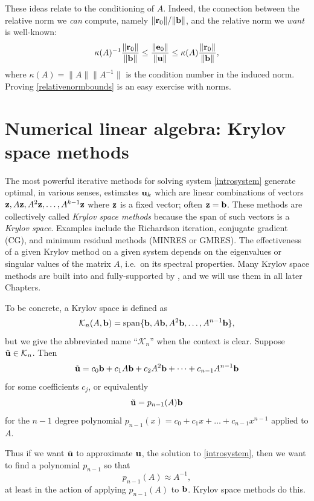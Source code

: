 These ideas relate to the conditioning of $A$.  Indeed, the connection between the relative norm we \emph{can} compute, namely $\|\mathbf{r}_0\|/\|\mathbf{b}\|$, and the relative norm we \emph{want} is well-known:
\begin{equation}
\kappa(A)^{-1} \frac{\|\mathbf{r}_0\|}{\|\mathbf{b}\|} \le \frac{\|\mathbf{e}_0\|}{\|\mathbf{u}\|} \le \kappa(A) \frac{\|\mathbf{r}_0\|}{\|\mathbf{b}\|}, \label{relativenormbounds}
\end{equation}
where $\kappa(A) = \|A\| \|A^{-1}\|$ is the condition number in the induced norm.  Proving \eqref{relativenormbounds} is an easy exercise with norms.



\section{Numerical linear algebra: Krylov space methods}

The most powerful iterative methods for solving system \eqref{introsystem} generate optimal, in various senses, estimates $\mathbf{u}_k$ which are linear combinations of vectors $\mathbf{z},A\mathbf{z},A^2\mathbf{z},\dots,A^{k-1}\mathbf{z}$ where $\mathbf{z}$ is a fixed vector; often $\mathbf{z}=\mathbf{b}$.  These methods are collectively called \emph{Krylov space methods} because the span of such vectors is a \emph{Krylov space}.  Examples include the Richardson iteration, conjugate gradient (CG), and minimum residual methods (MINRES or GMRES).  The effectiveness of a given Krylov method on a given system depends on the eigenvalues or singular values of the matrix $A$, i.e.~on its spectral properties.  Many Krylov space methods are built into and fully-supported by \PETSc, and we will use them in all later Chapters.

To be concrete, a Krylov space is defined as
    $$\mathcal{K}_n(A,\mathbf{b}) = \operatorname{span}\{\mathbf{b},A\mathbf{b},A^2\mathbf{b},\dots,A^{n-1}\mathbf{b}\},$$
but we give the abbreviated name ``$\mathcal{K}_n$'' when the context is clear.  Suppose $\tilde{\mathbf{u}} \in \mathcal{K}_n$.  Then
    $$\tilde{\mathbf{u}} = c_0 \mathbf{b} + c_1 A \mathbf{b} + c_2 A^2 \mathbf{b} + \dots + c_{n-1} A^{n-1} \mathbf{b}$$
for some coefficients $c_j$, or equivalently
    $$\tilde{\mathbf{u}} = p_{n-1}(A) \mathbf{b}$$
for the $n-1$ degree polynomial $p_{n-1}(x) = c_0 + c_1 x + \dots + c_{n-1} x^{n-1}$ applied to $A$.

Thus if we want $\tilde{\mathbf{u}}$ to approximate $\mathbf{u}$, the solution to \eqref{introsystem}, then we want to find a polynomial $p_{n-1}$ so that
\begin{equation}
    p_{n-1}(A) \approx A^{-1},  \label{krylovgoal}
\end{equation}
at least in the action of applying $p_{n-1}(A)$ to $\mathbf{b}$.  Krylov space methods do this.


